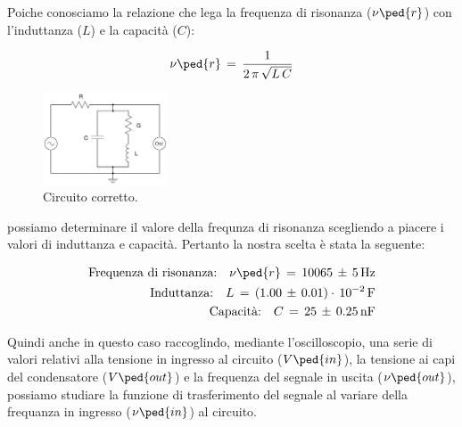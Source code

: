 Poiche conosciamo la relazione che lega la frequenza di risonanza ($\nu\ped{r}$) con l'induttanza ($L$) e la capacità ($C$):

\begin{equation}
	\nu\ped{r} \,=\, \frac{1}{2\,\pi\,\sqrt{L\,C}}
	\label{eq:risonanza banda}
\end{equation}
%
\begin{figure}
  \vspace{-0.5cm}
  \includegraphics[width=0.33\textwidth]{s_corr2.pdf}
  \caption{Circuito corretto.}
  \label{fig:corr2}
  \vspace{-1.5cm}
\end{figure}
%
possiamo determinare il valore della frequnza di risonanza scegliendo a piacere i valori di induttanza e capacità. Pertanto la nostra scelta è stata la seguente:

\begin{align*}
	\text{Frequenza di risonanza:} \quad \nu\ped{r} \,=\, 10065 \,\pm\, 5 \, \si{\hertz} \\
	\text{Induttanza:} \quad L \,=\, (1.00 \,\pm\, 0.01)\cdot\,10^{-2} \, \si{\farad} \\
	\text{Capacità:} \quad C \,=\, 25 \,\pm\, 0.25 \, \si{\nano\farad} \\
\end{align*}

Quindi anche in questo caso raccoglindo, mediante l'oscilloscopio, una serie di valori relativi alla tensione in ingresso al circuito ($V\ped{in}$), la tensione ai capi del condensatore ($V\ped{out}$) e la frequenza del segnale in uscita ($\nu\ped{out}$), possiamo studiare la funzione di trasferimento del segnale al variare della frequanza in ingresso ($\nu\ped{in}$) al circuito.

